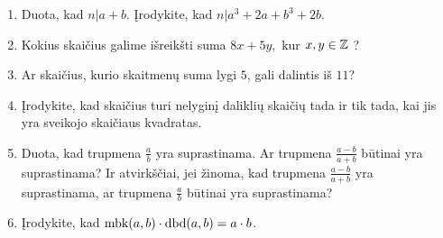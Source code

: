 \begin{enumerate}
  \item Duota, kad $n|a+b$. Įrodykite, kad $n|a^3+2a+b^3+2b$.  
  \item Kokius skaičius galime išreikšti suma $8x + 5y,$ kur $x,y \in \mathbb Z$ ?
  \item Ar skaičius, kurio skaitmenų suma lygi $5$, gali dalintis iš $11$?  
  \item Įrodykite, kad skaičius turi nelyginį daliklių skaičių tada ir tik
    tada, kai jis yra sveikojo skaičiaus kvadratas.
  \item Duota, kad trupmena $\frac{a}{b}$ yra suprastinama. Ar trupmena
    $\frac{a-b}{a+b}$ būtinai yra suprastinama? Ir atvirkščiai, jei žinoma, kad
    trupmena $\frac{a-b}{a+b}$ yra suprastinama, ar trupmena $\frac{a}{b}$
    būtinai yra suprastinama?  
  \item Įrodykite, kad $\operatorname{mbk}(a,b)\cdot \operatorname{dbd}(a,b)=a\cdot b$.  

\end{enumerate}
